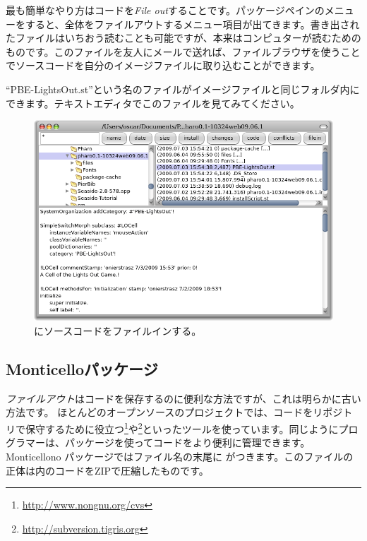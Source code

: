 \documentclass[a4paper,10pt,twoside]{book}
\begin{document}
最も簡単なやり方はコードを\emph{File out}することです。パッケージペインのメニューを\actclick すると、全体をファイルアウトするメニュー項目が出てきます。書き出されたファイルはいちおう読むことも可能ですが、本来はコンピュターが読むためのものです。このファイルを友人にメールで送れば、ファイルブラウザを使うことでソースコードを自分の\pharo イメージファイルに取り込むことができます。


``PBE-LightsOut.st''という名のファイルがイメージファイルと同じフォルダ内にできます。テキストエディタでこのファイルを見てみてください。


\begin{figure}[ht]
\centerline {\includegraphics[width=\textwidth]{FileIn}}
\caption{\pharo にソースコードをファイルインする。
}
\end{figure}

\subsection{Monticelloパッケージ}
\emph{ファイルアウト}はコードを保存するのに便利な方法ですが、これは明らかに古い方法です。
ほとんどのオープンソースのプロジェクトでは、コードをリポジトリで保守するために役立つ\footnote{\url{http://www.nongnu.org/cvs}}や\footnote{\url{http://subversion.tigris.org}}といったツールを使っています。同じように\pharo プログラマーは、パッケージを使ってコードをより便利に管理できます。Monticellono
パッケージではファイル名の末尾に がつきます。このファイルの正体は内のコードをZIPで圧縮したものです。
\end{document}
